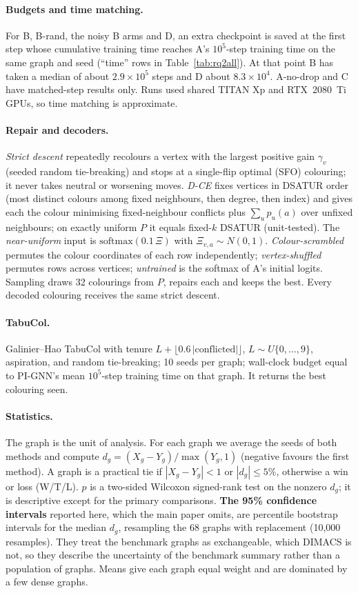 \documentclass[11pt]{article}
\begin{document}
\paragraph{Budgets and time matching.} For B, B-rand, the noisy B arms and D, an extra checkpoint is
saved at the first step whose cumulative training time reaches A's $10^5$-step training time on the
same graph and seed (``time'' rows in Table~\ref{tab:rq2all}). At that point B has taken a median of
about $2.9\times10^5$ steps and D about $8.3\times10^4$. A-no-drop and C have matched-step results only.
Runs used shared TITAN Xp and RTX~2080~Ti GPUs, so time matching is approximate.

\paragraph{Repair and decoders.} \emph{Strict descent} repeatedly recolours a vertex with the largest
positive gain $\gamma_v$ (seeded random tie-breaking) and stops at a single-flip optimal (SFO)
colouring; it never takes neutral or worsening moves. \emph{D-CE} fixes vertices in DSATUR order
(most distinct colours among fixed neighbours, then degree, then index) and gives each the colour
minimising fixed-neighbour conflicts plus $\sum_u p_u(a)$ over unfixed neighbours; on exactly uniform
$P$ it equals fixed-$k$ DSATUR (unit-tested). The \emph{near-uniform} input is
$\mathrm{softmax}(0.1\,\Xi)$ with $\Xi_{v,a}\sim N(0,1)$. \emph{Colour-scrambled} permutes the colour
coordinates of each row independently; \emph{vertex-shuffled} permutes rows across vertices;
\emph{untrained} is the softmax of A's initial logits. Sampling draws 32 colourings from $P$, repairs
each and keeps the best. Every decoded colouring receives the same strict descent.

\paragraph{TabuCol.} Galinier--Hao TabuCol with tenure $L+\lfloor0.6\,|\text{conflicted}|\rfloor$,
$L\sim U\{0,\dots,9\}$, aspiration, and random tie-breaking; 10 seeds per graph; wall-clock budget
equal to PI-GNN's mean $10^5$-step training time on that graph. It returns the best colouring seen.

\paragraph{Statistics.} The graph is the unit of analysis. For each graph we average the seeds of
both methods and compute $d_g=(X_g-Y_g)/\max(Y_g,1)$ (negative favours the first method). A graph is
a practical tie if $|X_g-Y_g|<1$ or $|d_g|\le5\%$, otherwise a win or loss (W/T/L). $p$ is a two-sided
Wilcoxon signed-rank test on the nonzero $d_g$; it is descriptive except for the primary comparisons.
\textbf{The 95\% confidence intervals} reported here, which the main paper omits, are percentile
bootstrap intervals for the median $d_g$, resampling the 68 graphs with replacement (10{,}000
resamples). They treat the benchmark graphs as exchangeable, which DIMACS is not, so they describe
the uncertainty of the benchmark summary rather than a population of graphs. Means give each graph
equal weight and are dominated by a few dense graphs.
\end{document}
